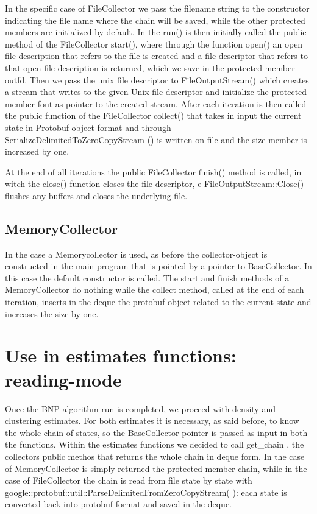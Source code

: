 In the specific case of FileCollector we pass the filename string to the constructor  indicating the file name where the chain will be saved, while the other protected members are initialized by default. In the run() is then initially called the public method of the FileCollector start(), where through the function open() an open file description that refers to the file is created and a file descriptor that refers to that open file description is returned, which we save in the protected member outfd. Then we pass the unix file descriptor to FileOutputStream() which creates a stream that writes to the given Unix file descriptor and initialize the protected member fout as pointer to the created stream.
After each iteration is then called the public function of the FileCollector collect() that takes in input the current state in Protobuf object format and through SerializeDelimitedToZeroCopyStream () is written on file and the size member is increased by one.

At the end of all iterations the public FileCollector finish() method is called, in witch the close() function closes the file descriptor, e FileOutputStream::Close() flushes any buffers and closes the underlying file.

\subsection{MemoryCollector}
In the case a Memorycollector is used, as before the collector-object is constructed in the main program that is pointed by a pointer to BaseCollector. In this case the default constructor is called.  The start and finish methods of a MemoryCollector do nothing while the collect method, called at the end of each iteration, inserts in the deque the protobuf object related to the current state and increases the size by one.

\section{Use in estimates functions: reading-mode}
Once the BNP algorithm run is completed, we proceed with density and clustering estimates. For both estimates it is necessary, as said before, to know the whole chain of states, so the BaseCollector pointer is passed as input in both the functions. Within the estimates functions we decided to call get\_chain , the collectors public methos that returns the whole chain in deque form. In the case of MemoryCollector is simply returned the  protected member chain, while in the case of FileCollector the chain is read from file state by state with google::protobuf::util::ParseDelimitedFromZeroCopyStream( ): each state is converted back into protobuf format and saved in the deque.

